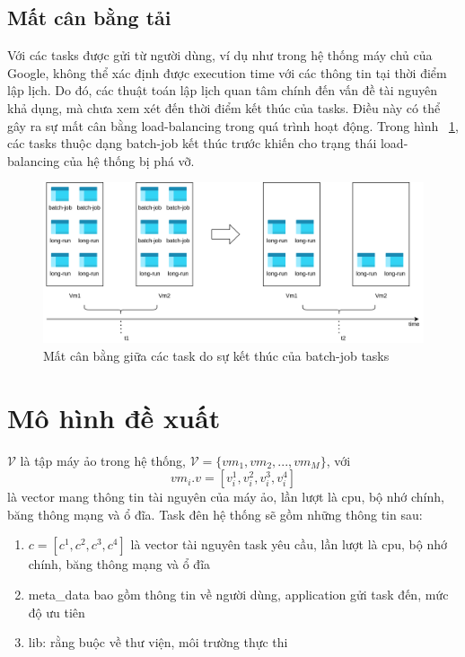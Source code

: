 \documentclass{my_style}
\begin{document}
\subsection{Mất cân bằng tải}
\label{unload_balancing}
Với các tasks được gửi từ người dùng, ví dụ như trong hệ thống máy chủ của Google\cite{18}, không thể xác định được execution time với các thông tin tại thời điểm lập lịch. Do đó, các thuật toán lập lịch quan tâm chính đến vấn đề tài nguyên khả dụng, mà chưa xem xét đến thời điểm kết thúc của tasks. Điều này có thể gây ra sự mất cân bằng load-balancing trong quá trình hoạt động. Trong hình ~\ref{fig:unload_balancing}, các tasks thuộc dạng batch-job kết thúc trước khiến cho trạng thái load-balancing của hệ thống bị phá vỡ. 
\begin{figure}
	\centering
	\includegraphics[scale=0.5]{images/unload_balancing.png}
	\caption{Mất cân bằng giữa các task do sự kết thúc của batch-job tasks}
	\label{fig:unload_balancing}
\end{figure}

\section{Mô hình đề xuất}
$\mathcal{V}$ là tập máy ảo trong hệ thống, $\mathcal{V} = \{vm_{1}, vm_{2}, ..., vm_{M}\}$, với 
\[
vm_{i}.v = [v_{i}^{1}, v_{i}^{2}, v_{i}^{3}, v_{i}^{4}]
\]
là vector mang thông tin tài nguyên của máy ảo, lần lượt là cpu, bộ nhớ chính, băng thông mạng và ổ đĩa. Task đên hệ thống sẽ gồm những thông tin sau: 
\begin{enumerate}
	\item $c = [c^{1}, c^{2}, c^{3}, c^{4}]$ là vector tài nguyên task yêu cầu, lần lượt là cpu, bộ nhớ chính, băng thông mạng và ổ đĩa
	\item meta\_data bao gồm thông tin về người dùng, application gửi task đến, mức độ ưu tiên
	\item lib: rằng buộc về thư viện, môi trường thực thi 
\end{enumerate}
\end{document}
